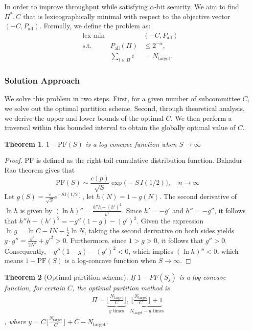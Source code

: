 \documentclass[journal]{IEEEtran}
\newtheorem{theorem}{Theorem}
\begin{document}
In order to improve throughput while satisfying $\alpha$-bit security, We aim to find $\Pi^*,C$ that is lexicographically minimal with respect to the objective vector $(-C, P_{\text{all}})$. Formally, we define the problem as:
\begin{align}
&\text{lex-min} && (-C, P_{\text{all}}) \nonumber \\
&\text{s.t.} \quad & P_{\text{all}}(\Pi) &\le 2^{-\alpha}, \nonumber \\
& & \sum_{i \in \Pi} i &= N_{\text{target}}.
\end{align}

\subsubsection{Solution Approach}
We solve this problem in two steps. First, for a given number of subcommittee $C$, we solve out the optimal partition scheme. Second, through theoretical analysis, we derive the upper and lower bounds of the optimal $C $. We then perform a traversal within this bounded interval to obtain the globally optimal value of $C$.

\begin{theorem}
$1-\text{PF}(S)$ is a log-concave function when $S \to \infty$
\end{theorem}
\begin{proof}
$\text{PF}$ is defined as the right-tail cumulative distribution function. Bahadur–Rao theorem\cite{BahadurRao1960} gives that
\begin{equation}
\text{PF}(S) \sim \frac{c(p)}{\sqrt{S}} \exp \bigl( -S \, I(1/2) \bigr),\quad n \to \infty
\end{equation}
Let $g(S) =\frac{c}{\sqrt{S}} e^{-S I(1/2)}$, let \( h(N) = 1 - g(N) \). The second derivative of \( \ln h \) is given by $(\ln h)'' = \frac{h'' h - (h')^2}{h^2}$. Since \( h' = -g' \) and \( h'' = -g'' \), it follows that $h'' h - (h')^2 = -g''(1 - g) - (g')^2$. Given the expression $\ln g = \ln C - I N - \frac{1}{2}\ln N$, taking the second derivative on both sides yields $g\cdot g'' = \frac{g^2}{2N^2}+g'^2 >0$. Furthermore, since \( 1>g > 0 \), it follows that \( g'' > 0 \). Consequently, $-g''(1 - g) - (g')^2 < 0$, which implies $(\ln h)'' < 0$, which means $1-\text{PF}(S)$ is a log-concave function when $S \to \infty$.
\end{proof}

\begin{theorem}[Optimal partition scheme]
If $1-PF(S_j)$ is a log-concave function, for certain $C$, the optimal partition method is
\begin{align}
\Pi = \underbrace{\lfloor\frac{N_{\text{target}}}{C} \rfloor}_{y \text{ times}},\underbrace{\lfloor\frac{N_{\text{target}}}{C} \rfloor+1}_{N_{\text{target}}-y \text{ times}}
\end{align}
, where $y=C\lfloor\frac{N_{\text{target}}}{C} \rfloor+C-N_{\text{target}}$.
\end{theorem}
\end{document}
